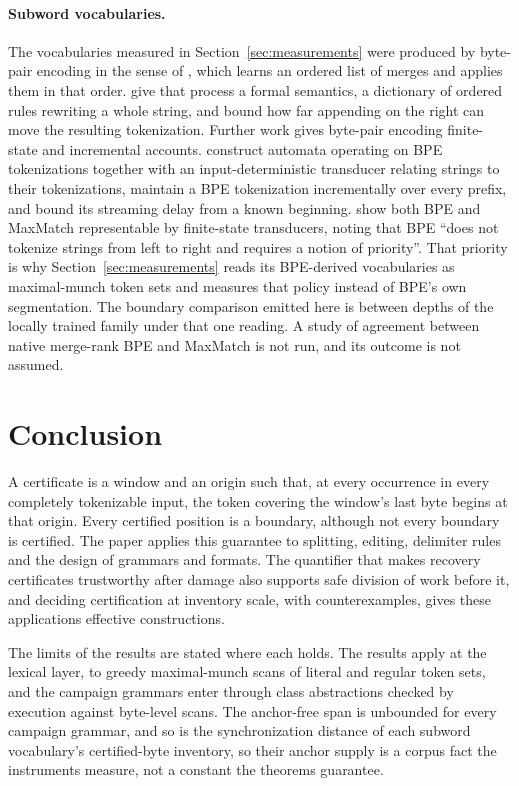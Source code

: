 \documentclass[11pt,a4paper]{article}
\theoremstyle{definition}
\theoremstyle{plain}
\begin{document}
\paragraph{Subword vocabularies.} The vocabularies measured in Section~\ref{sec:measurements} were produced by byte-pair
encoding in the sense of \citet{sennrich2016subword}, which learns an ordered list of merges and applies them in that
order. \citet{berglund2023formalizing} give that process a formal semantics, a dictionary of ordered rules rewriting a
whole string, and bound how far appending on the right can move the resulting tokenization. Further work gives byte-pair
encoding finite-state and incremental accounts. \citet{berglund2025bpedfa} construct automata operating on BPE
tokenizations together with an input-deterministic transducer relating strings to their tokenizations,
\citet{jiang2026incremental} maintain a BPE tokenization incrementally over every prefix, and
\citet{mamouras2026bpedelay} bound its streaming delay from a known beginning. \citet{cognetta2025tokenization} show
both BPE and MaxMatch representable by finite-state transducers, noting that BPE ``does not tokenize strings from left
to right and requires a notion of priority''. That priority is why Section~\ref{sec:measurements} reads its BPE-derived
vocabularies as maximal-munch token sets and measures that policy instead of BPE's own segmentation. The boundary
comparison emitted here is between depths of the locally trained family under that one reading. A study of agreement
between native merge-rank BPE and MaxMatch is not run, and its outcome is not assumed.

\section{Conclusion}

A certificate is a window and an origin such that, at every occurrence in every completely tokenizable input, the token
covering the window's last byte begins at that origin. Every certified position is a boundary, although not every
boundary is certified. The paper applies this guarantee to splitting, editing, delimiter rules and the design of
grammars and formats. The quantifier that makes recovery certificates trustworthy after damage also supports safe
division of work before it, and deciding certification at inventory scale, with counterexamples, gives these
applications effective constructions.

The limits of the results are stated where each holds. The results apply at the lexical layer, to greedy maximal-munch
scans of literal and regular token sets, and the campaign grammars enter through class abstractions checked by execution
against byte-level scans. The anchor-free span is unbounded for every campaign grammar, and so is the synchronization
distance of each subword vocabulary's certified-byte inventory, so their anchor supply is a corpus fact the instruments
measure, not a constant the theorems guarantee.
\end{document}
